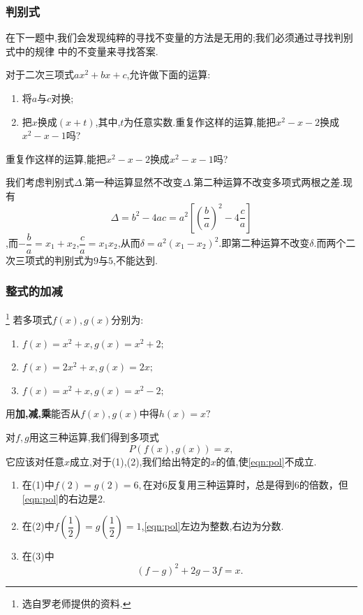 \subsubsection{判别式}
在下一题中,我们会发现纯粹的寻找不变量的方法是无用的;我们必须通过寻找判别式中的规律
中的不变量来寻找答案.
\begin{problem}
    对于二次三项式$ax^2+bx+c$,允许做下面的运算:
    \begin{enumerate}
        \item 将$a$与$c$对换;
        \item 把$x$换成$(x+t)$,其中,$t$为任意实数.重复作这样的运算,能把$x^2-x-2$换成$x^2-x-1$吗?
    \end{enumerate}
    重复作这样的运算,能把$x^2-x-2$换成$x^2-x-1$吗?
\end{problem}
\begin{solution}
    我们考虑判别式$\Delta$.第一种运算显然不改变$\Delta$.第二种运算不改变多项式两根之差.现有$$\Delta=b^2-4ac=a^2\left[\left(\dfrac{b}{a}\right)^2-4\dfrac{c}{a}\right]$$,而$-\dfrac{b}{a}=x
    _1+x_2$,$\dfrac{c}{a}=x_1x_2$,从而$\delta=a^2\left( x_1-x_2 \right)^2.$即第二种运算不改变$\delta.$而两个二次三项式的判别式为$9$与$5$,不能达到.
\end{solution}
\subsubsection{整式的加减}
\begin{problem}\footnote{选自罗老师提供的资料.}
    若多项式$f(x),g(x)$分别为:
    \begin{enumerate}
        \item $f(x)=x^2+x,g(x)=x^2+2;$
        \item $f(x)=2x^2+x,g(x)=2x;$
        \item $f(x)=x^2+x,g(x)=x^2-2;$
    \end{enumerate}
    用\textbf{加,减,乘}能否从$f(x),g(x)$中得$h(x)=x?$
\end{problem}
\begin{solution}
    对$f,g$用这三种运算,我们得到多项式\begin{equation}\label{eqn:pol}
        P(f(x),g(x))=x,
    \end{equation}
    它应该对任意$x$成立,对于(1),(2),我们给出特定的$x$的值,使\eqref{eqn:pol}不成立.
    \begin{enumerate}
        \item 在(1)中$f(2)=g(2)=6,$在对6反复用三种运算时，总是得到6的倍数，但\eqref{eqn:pol}的右边是2.
        \item 在(2)中$f(\dfrac{1}{2})=g(\dfrac12)=1$,\eqref{eqn:pol}左边为整数,右边为分数.
        \item 在(3)中$$(f-g)^2+2g-3f=x.$$
    \end{enumerate}
    
    
\end{solution}

